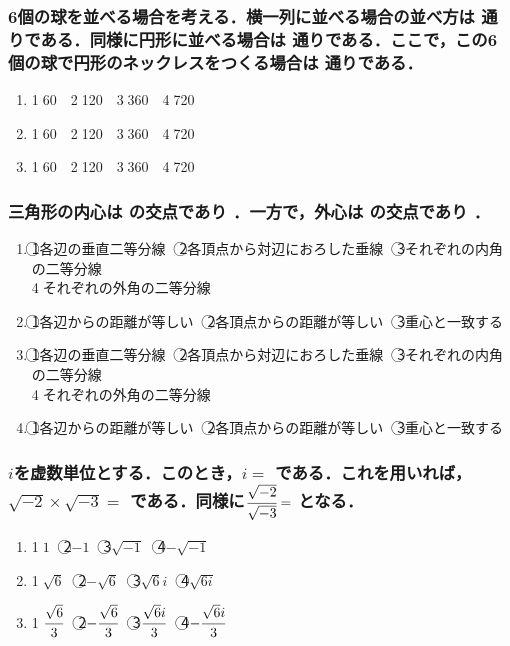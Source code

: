 \documentclass[onecolumn,10pt]{jarticle}
\newcommand{\ctext}[1]{\textcircled{\scriptsize #1}}
\begin{document}
\subsubsection{6個の球を並べる場合を考える．横一列に並べる場合の並べ方は  通りである．同様に円形に並べる場合は  通りである．ここで，この6個の球で円形のネックレスをつくる場合は  通りである．}
\begin{enumerate}[(1)]
    \item \ctext{1}60　\ctext{2}120　\ctext{3}360　\ctext{4}720
    \item \ctext{1}60　\ctext{2}120　\ctext{3}360　\ctext{4}720
    \item \ctext{1}60　\ctext{2}120　\ctext{3}360　\ctext{4}720
\end{enumerate}

\subsubsection{三角形の内心は  の交点であり  ．一方で，外心は  の交点であり  ．}
\begin{enumerate}[(1)]
    \item \ctext{1}各辺の垂直二等分線　\ctext{2}各頂点から対辺におろした垂線　\ctext{3}それぞれの内角の二等分線\\\ctext{4}それぞれの外角の二等分線
    \item \ctext{1}各辺からの距離が等しい　\ctext{2}各頂点からの距離が等しい　\ctext{3}重心と一致する
    \item \ctext{1}各辺の垂直二等分線　\ctext{2}各頂点から対辺におろした垂線　\ctext{3}それぞれの内角の二等分線\\\ctext{4}それぞれの外角の二等分線
    \item \ctext{1}各辺からの距離が等しい　\ctext{2}各頂点からの距離が等しい　\ctext{3}重心と一致する
\end{enumerate}

\subsubsection{$i$を虚数単位とする．このとき，$i=$  である．これを用いれば，$\sqrt{-2}\times\sqrt{-3}=$  である．同様に$\cfrac{\sqrt{-2}}{\sqrt{-3}}=$  となる．}
\begin{enumerate}[(1)]
    \item \ctext{1}$1$　\ctext{2}$-1$　\ctext{3}$\sqrt{-1}$　\ctext{4}$-\sqrt{-1}$
    \item \ctext{1}$\sqrt{6}$　\ctext{2}$-\sqrt{6}$　\ctext{3}$\sqrt{6}i$　\ctext{4}$\sqrt{6i}$
    \item \ctext{1}$\cfrac{\sqrt{6}}{3}$　\ctext{2}$-\cfrac{\sqrt{6}}{3}$　\ctext{3}$\cfrac{\sqrt{6}i}{3}$　\ctext{4}$-\cfrac{\sqrt{6}i}{3}$
\end{enumerate}
\end{document}
